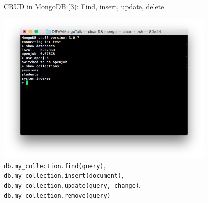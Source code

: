 \begin{frame}{CRUD in MongoDB (3): Find, insert, update, delete}
  \begin{center}
    \includegraphics[width=0.80\textwidth]{imgs/shell_basic}\\\noindent
    \lstinline{db.my_collection.find(query)}, \\\noindent
    \lstinline{db.my_collection.insert(document)}, \\\noindent
    \lstinline{db.my_collection.update(query, change)}, \\\noindent
    \lstinline{db.my_collection.remove(query)}
  \end{center}
\end{frame}
